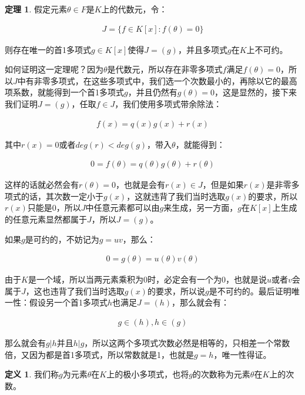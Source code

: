 \documentclass[12pt, a4paper, oneside]{ctexart}
\theoremstyle{definition}
\newtheorem*{definition}{定义}
\newtheorem*{theorem}{定理}
\begin{document}
\begin{theorem}
假定元素$\theta\in F$是$K$上的代数元，令：

\begin{align*}
J=\{f\in K[x]:f(\theta)=0\}
\end{align*}

则存在唯一的首1多项式$g\in K[x]$使得$J=(g)$，并且多项式$g$在$K$上不可约。
\end{theorem}

如何证明这一定理呢？因为$\theta$是代数元，所以存在非零多项式$f$满足$f(\theta)=0$，所以$J$中有非零多项式，在这些多项式中，我们选一个次数最小的，再除以它的最高项系数，就能得到一个首1多项式$g$，并且仍然有$g(\theta)=0$，这是显然的，接下来我们证明$J=(g)$，任取$f\in J$，我们使用多项式带余除法：

\begin{align*}
f(x)=q(x)g(x)+r(x)
\end{align*}

其中$r(x)=0$或者$deg(r)<deg(g)$，带入$\theta$，就能得到：

\begin{align*}
0=f(\theta)=q(\theta)g(\theta)+r(\theta)
\end{align*}

这样的话就必然会有$r(\theta)=0$，也就是会有$r(x)\in J$，但是如果$r(x)$是非零多项式的话，其次数一定小于$g(x)$，这就违背了我们当时选取$g(x)$的要求，所以$r(x)$只能是0，所以$J$中任意元素都可以由$g$来生成，另一方面，$g$在$K[x]$上生成的任意元素显然都属于$J$，所以$J=(g)$。

如果$g$是可约的，不妨记为$g=uv$，那么：

\begin{align*}
0=g(\theta)=u(\theta)v(\theta)
\end{align*}    

由于$K$是一个域，所以当两元素乘积为0时，必定会有一个为0，也就是说$u$或者$v$会属于$J$，这也违背了我们当时选取$g(x)$的要求，所以说$g$是不可约的。最后证明唯一性：假设另一个首1多项式$h$也满足$J=(h)$，那么就会有：

\begin{align*}
g\in (h),h\in (g)
\end{align*}

那么就会有$g|h$并且$h|g$，所以这两个多项式次数必然是相等的，只相差一个常数倍，又因为都是首1多项式，所以常数就是1，也就是$g=h$，唯一性得证。

\begin{definition}
我们称$g$为元素$\theta$在$K$上的极小多项式，也将$g$的次数称为元素$\theta$在$K$上的次数。
\end{definition}
\end{document}

